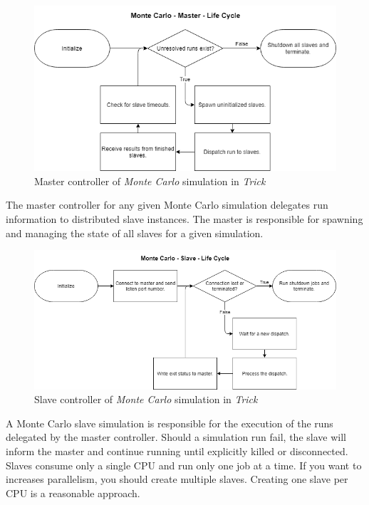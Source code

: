 \documentclass[12pt,a4paper]{report}
\begin{document}
        \begin{figure}[ht]
            \centerline{\includegraphics[scale=0.6]{MonteCarlo-Master-LifeCycle}}
            \caption{Master controller of \emph{Monte Carlo} simulation in \emph{Trick}}
            \label{fig_master_controller}
        \end{figure}
        The master controller for any given Monte Carlo simulation delegates run information to distributed slave instances. The master is responsible for spawning and managing the state of all slaves for a given simulation.

        \begin{figure}[ht]
            \centerline{\includegraphics[scale=0.5]{MonteCarlo-Slave-LifeCycle}}
            \caption{Slave controller of \emph{Monte Carlo} simulation in \emph{Trick}}
            \label{fig_slave_controller}
        \end{figure}
        A Monte Carlo slave simulation is responsible for the execution of the runs delegated by the master controller. Should a simulation run fail, the slave will inform the master and continue running until explicitly killed or disconnected. Slaves consume only a single CPU and run only one job at a time. If you want to increases parallelism, you should create multiple slaves. Creating one slave per CPU is a reasonable approach.
\end{document}
